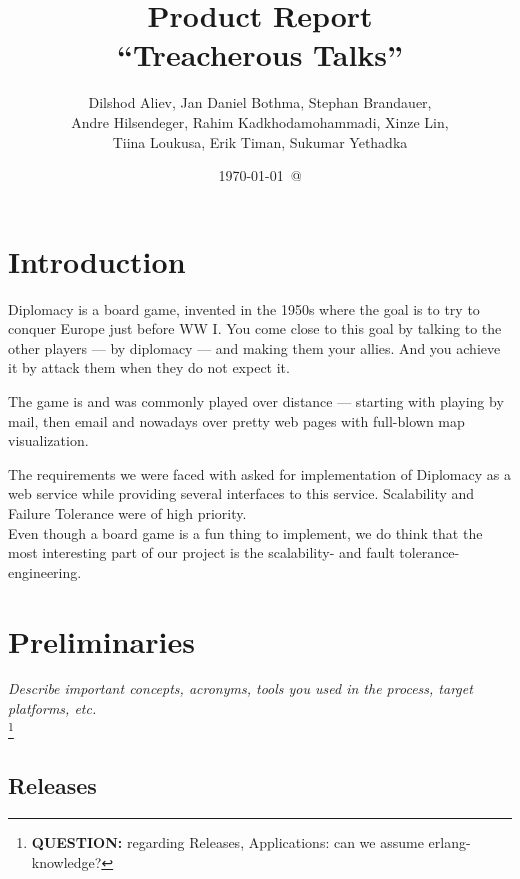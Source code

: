 \documentclass[11pt,a4paper]{report}
\newcommand{\hi}[1]{{\color{red}\em #1\/}\\}
\newcommand{\ask}[1]{\footnote{{\color{red} {\bf QUESTION:} #1}}}
\begin{document}
\title{Product Report \\
  ``Treacherous Talks''}
\date{\today\ @ \currenttime}
\author{Dilshod Aliev, Jan Daniel Bothma, Stephan Brandauer,\\
 Andre Hilsendeger, Rahim Kadkhodamohammadi, Xinze Lin,\\
Tiina Loukusa, Erik Timan, Sukumar Yethadka}
\maketitle
\tableofcontents


\chapter{Introduction}
Diplomacy is a board game, invented in the 1950s where the goal is to try to 
conquer Europe just before WW I. You come close to this goal by talking to the
other players --- by diplomacy --- and making them your allies. And you achieve
it by attack them when they do not expect it.

The game is and was commonly played over distance --- starting with playing by 
mail, then email and nowadays over pretty web pages with full-blown map
visualization.

The requirements we were faced with asked for implementation of Diplomacy as a
web service while providing several interfaces to this service. Scalability and
Failure Tolerance were of high priority. \\
Even though a board game is a fun thing to implement, we do think that the most
interesting part of our project is the scalability- and fault tolerance-
engineering.

\chapter{Preliminaries}
\hi{Describe important concepts, acronyms, tools you used in the process, target platforms, etc.}
\ask{regarding Releases, Applications: can we assume erlang-knowledge?}
\section{Releases}
\end{document}
